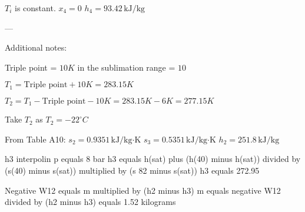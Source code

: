 \( T_i \) is constant.  
\( x_4 = 0 \)  
\( h_4 = 93.42 \, \text{kJ/kg} \)  

---

Additional notes:  

Triple point = \( 10K \) in the sublimation range = \( 10 \)  

\( T_1 = \text{Triple point} + 10K = 283.15K \)  

\( T_2 = T_1 - \text{Triple point} - 10K = 283.15K - 6K = 277.15K \)  

Take \( T_2 \) as \( T_2 = -22^\circ C \)  

From Table A10:  
\( s_2 = 0.9351 \, \text{kJ/kg·K} \)  
\( s_3 = 0.5351 \, \text{kJ/kg·K} \)  
\( h_2 = 251.8 \, \text{kJ/kg} \)

h3 interpolin  
p equals 8 bar  
h3 equals h(sat) plus (h(40) minus h(sat)) divided by (s(40) minus s(sat)) multiplied by (s 82 minus s(sat))  
h3 equals 272.95  

Negative W12 equals m multiplied by (h2 minus h3)  
m equals negative W12 divided by (h2 minus h3) equals 1.52 kilograms